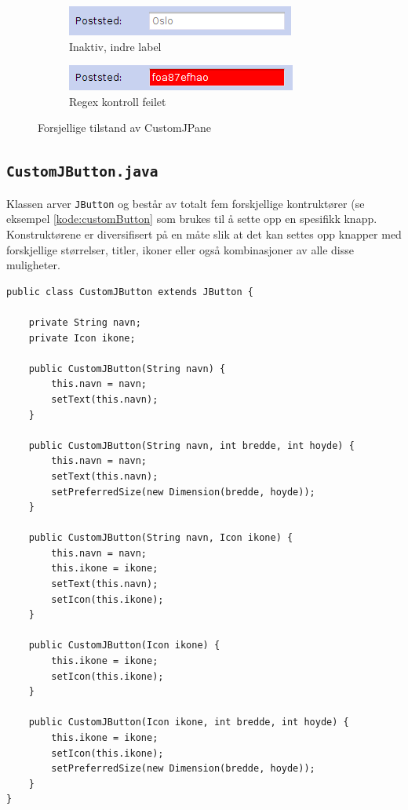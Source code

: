 \begin{figure}[ht!]
\centering
\begin{subfigure}[b]{1\textwidth}
\centering

\includegraphics[scale=0.7]{./img/produktdokumentasjon/swing_componenter/1.png}
\caption{Inaktiv, indre label}
\label{fig:custom1}
\end{subfigure}
\quad

\begin{subfigure}[b]{1\textwidth}
\centering
\includegraphics[scale=0.7]{./img/produktdokumentasjon/swing_componenter/2.png}
\caption{Regex kontroll feilet}
\label{fig:custom2}
\end{subfigure}
\quad

\caption{Forsjellige tilstand av CustomJPane}\label{fig:customjpane}
\end{figure}



\subsection{\texttt{CustomJButton.java}}
Klassen arver \texttt{JButton} og består av totalt fem forskjellige kontruktører (se eksempel \ref{kode:customButton} som brukes til å sette opp en spesifikk knapp. Konstruktørene er diversifisert på en måte slik at det kan settes opp knapper med forskjellige størrelser, titler, ikoner eller også kombinasjoner av alle disse muligheter. 

\begin{lstlisting}[caption=De forskjellige konstruktørene i \texttt{CustomJButton}. ,label=kode:customButton]
public class CustomJButton extends JButton {

    private String navn;
    private Icon ikone;

    public CustomJButton(String navn) {
        this.navn = navn;
        setText(this.navn);
    }

    public CustomJButton(String navn, int bredde, int hoyde) {
        this.navn = navn;
        setText(this.navn);
        setPreferredSize(new Dimension(bredde, hoyde));
    }

    public CustomJButton(String navn, Icon ikone) {
        this.navn = navn;
        this.ikone = ikone;
        setText(this.navn);
        setIcon(this.ikone);
    }

    public CustomJButton(Icon ikone) {
        this.ikone = ikone;
        setIcon(this.ikone);
    }

    public CustomJButton(Icon ikone, int bredde, int hoyde) {
        this.ikone = ikone;
        setIcon(this.ikone);
        setPreferredSize(new Dimension(bredde, hoyde));
    }
}
\end{lstlisting}





